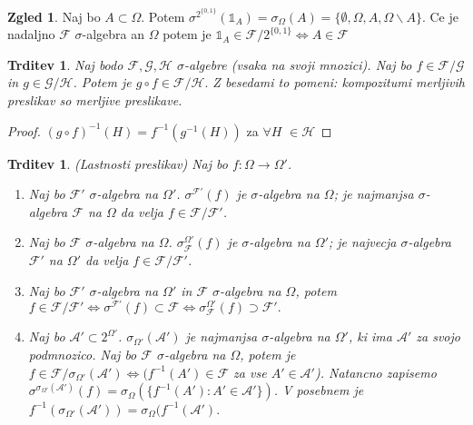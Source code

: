 \documentclass[a4paper,12pt]{article}
\theoremstyle{definition} %
\newtheorem{zgled}[definicija]{Zgled}
\theoremstyle{plain} %
\newtheorem{trditev}[definicija]{Trditev}
\newcommand{\F}{\mathcal{F}}
\newcommand{\A}{\mathcal{A}}
\begin{document}
            \begin{zgled}
                Naj bo $A \subset \Omega$. Potem $\sigma^{2^{\{0, 1\}}}(\mathds{1}_A) = \sigma_\Omega (A) = \{\emptyset, \Omega, A, \Omega\backslash A\}$. Ce je nadaljno $\F$ $\sigma$-algebra an $\Omega$ potem je  $\mathds{1}_A \in \F/2^{\{0, 1\}} \iff A \in \F$ 
            \end{zgled}

            \begin{trditev}
                Naj bodo $\F, \mathcal{G}, \mathcal{H}$ $\sigma$-algebre (vsaka na svoji mnozici). Naj bo $f \in \F/\mathcal{G}$ in $g \in \mathcal{G}/\mathcal{H}$. Potem je $g \circ f \in \F/\mathcal{H}.$ Z besedami to pomeni: kompozitumi merljivih preslikav so merljive preslikave.
            \end{trditev}

            \begin{proof}
                $(g \circ f)^{-1}(H) = f^{-1}(g^{-1}(H))$ za $\forall H$ $\in \mathcal{H}$
            \end{proof}

            \begin{trditev} (Lastnosti preslikav)
                Naj bo $f: \Omega \rightarrow \Omega'$.
                \begin{enumerate}
                    \item Naj bo $\F'$ $\sigma$-algebra na $\Omega'$. $\sigma^{\F'}(f)$ je $\sigma$-algebra na $\Omega$; je najmanjsa $\sigma$-algebra $\mathcal{F}$ na $\Omega$ da velja $f \in \mathcal{F}/\F'$.
                    \item Naj bo $\F$ $\sigma$-algebra na $\Omega$. $\sigma_{\F}^{\Omega'}(f)$ je $\sigma$-algebra na $\Omega'$; je najvecja $\sigma$-algebra $\mathcal{F}'$ na $\Omega'$ da velja $f \in \mathcal{F}/\F'$.
                    \item Naj bo $\F'$ $\sigma$-algebra na $\Omega'$ in $\F$ $\sigma$-algebra na $\Omega$, potem $f \in \F/\F' \iff \sigma^{\F'}(f) \subset \F \iff \sigma_{\F}^{\Omega'}(f) \supset \F'.$
                    \item Naj bo $\A' \subset 2^{\Omega'}$. $\sigma_{\Omega'}(\A')$ je najmanjsa $\sigma$-algebra na $\Omega'$, ki ima $\A'$ za svojo podmnozico. Naj bo $\F$ $\sigma$-algebra na $\Omega$, potem je $f \in \F/\sigma_{\Omega'}(\A') \iff (f^{-1}(A') \in \F$ za vse $A' \in \A'$). Natancno zapisemo $\sigma^{\sigma_{\Omega'}(\A')}(f) = \sigma_\Omega(\{f^{-1}(A'):A' \in \A'\})$. V posebnem je $f^{-1}(\sigma_{\Omega '}(\A ')) = \sigma_{\Omega}(f^{-1}(\A').$
                \end{enumerate}
            \end{trditev}
\end{document}
